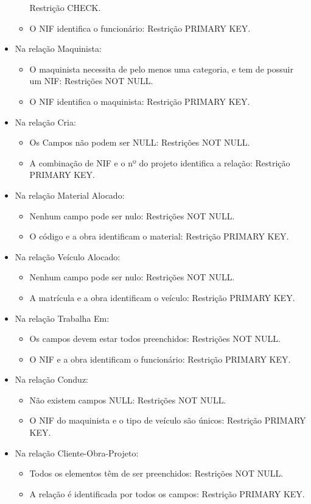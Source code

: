 \documentclass{report}
\begin{document}
\begin{itemize}
\begin{itemize}
				Restrição CHECK.
				\item O NIF identifica o funcionário: Restrição PRIMARY KEY.
			\end{itemize}
			\item Na relação Maquinista:
			\begin{itemize}
				\item O maquinista necessita de pelo menos uma categoria, e tem de possuir um 
				NIF: Restrições NOT NULL.
				\item O NIF identifica o maquinista: Restrição PRIMARY KEY.
			\end{itemize}
			\item Na relação Cria:
			\begin{itemize}
				\item Os Campos não podem ser NULL: Restrições NOT NULL.
				\item A combinação de NIF e o nº do projeto identifica a relação: Restrição
				PRIMARY KEY.
			\end{itemize}
			\item Na relação Material Alocado:
			\begin{itemize}
				\item Nenhum campo pode ser nulo: Restrições NOT NULL.
				\item O código e a obra identificam o material: Restrição PRIMARY KEY.
			\end{itemize}
			\item Na relação Veículo Alocado:
			\begin{itemize}
				\item Nenhum campo pode ser nulo: Restrições NOT NULL.
				\item A matrícula e a obra identificam o veículo: Restrição PRIMARY KEY.
			\end{itemize}
			\item Na relação Trabalha Em:
			\begin{itemize}
				\item Os campos devem estar todos preenchidos: Restrições NOT NULL.
				\item O NIF e a obra identificam o funcionário: Restrição PRIMARY KEY.
			\end{itemize}
			\item Na relação Conduz:
			\begin{itemize}
				\item Não existem campos NULL: Restrições NOT NULL.
				\item O NIF do maquinista e o tipo de veículo são únicos: Restrição PRIMARY 
				KEY.
			\end{itemize}
			\item Na relação Cliente-Obra-Projeto:
			\begin{itemize}
				\item Todos os elementos têm de ser preenchidos: Restrições NOT NULL.
				\item A relação é identificada por todos os campos: Restrição PRIMARY KEY.
			\end{itemize}
		\end{itemize}
		
		
		
\end{document}
